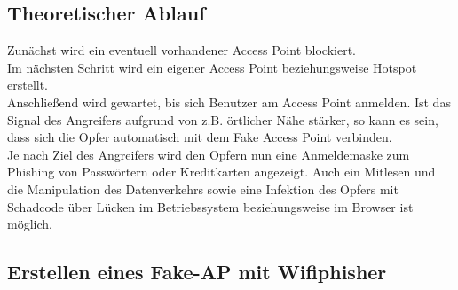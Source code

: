 \subsection{Theoretischer Ablauf}
Zunächst wird ein eventuell vorhandener Access Point blockiert. \\
Im nächsten Schritt wird ein eigener Access Point beziehungsweise Hotspot erstellt. \\
Anschließend wird gewartet, bis sich Benutzer am Access Point anmelden. Ist das Signal des Angreifers aufgrund von z.B. örtlicher Nähe stärker, so kann es sein, dass sich die Opfer automatisch mit dem Fake Access Point verbinden. \\
Je nach Ziel des Angreifers wird den Opfern nun eine Anmeldemaske zum Phishing von Passwörtern oder Kreditkarten angezeigt.
Auch ein Mitlesen und die Manipulation des Datenverkehrs sowie eine Infektion des Opfers mit Schadcode über Lücken im Betriebssystem beziehungsweise im Browser ist möglich.

\subsection{Erstellen eines Fake-AP mit Wifiphisher}
